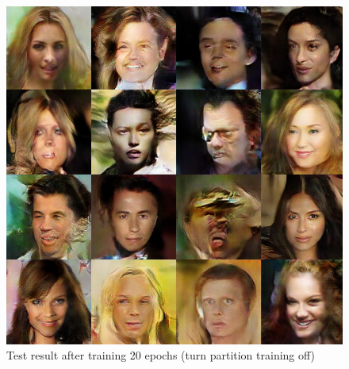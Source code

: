 \begin{figure}
\begin{minipage}[t]{0.48\linewidth}
            \centering
            \includegraphics[width=\textwidth]{figures/result_part_off.png}
            \caption{Test result after training 20 epochs (turn partition training off)}
            \label{part_off}
        \end{minipage}
    \end{figure}

